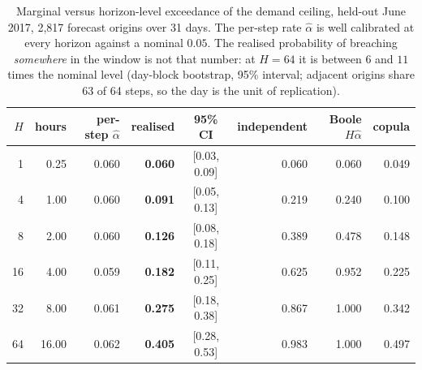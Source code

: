 \begin{table}[t]
\centering
\scriptsize
\setlength{\tabcolsep}{3pt}
\begin{tabular}{rrrrcrrr}
\toprule
$H$ & hours & per-step $\hat\alpha$ & realised & 95\% CI & independent & Boole $H\hat\alpha$ & copula \\
\midrule
1 & 0.25 & 0.060 & \textbf{0.060} & [0.03, 0.09] & 0.060 & 0.060 & 0.049 \\
4 & 1.00 & 0.060 & \textbf{0.091} & [0.05, 0.13] & 0.219 & 0.240 & 0.100 \\
8 & 2.00 & 0.060 & \textbf{0.126} & [0.08, 0.18] & 0.389 & 0.478 & 0.148 \\
16 & 4.00 & 0.059 & \textbf{0.182} & [0.11, 0.25] & 0.625 & 0.952 & 0.225 \\
32 & 8.00 & 0.061 & \textbf{0.275} & [0.18, 0.38] & 0.867 & 1.000 & 0.342 \\
64 & 16.00 & 0.062 & \textbf{0.405} & [0.28, 0.53] & 0.983 & 1.000 & 0.497 \\
\bottomrule
\end{tabular}
\caption{Marginal versus horizon-level exceedance of the demand ceiling, held-out June 2017, 2,817 forecast origins over 31 days. The per-step rate $\hat\alpha$ is well calibrated at every horizon against a nominal $0.05$. The realised probability of breaching \emph{somewhere} in the window is not that number: at $H=64$ it is between $6$ and $11$ times the nominal level (day-block bootstrap, 95\% interval; adjacent origins share 63 of 64 steps, so the day is the unit of replication).}
\label{tab:horizon}
\end{table}
